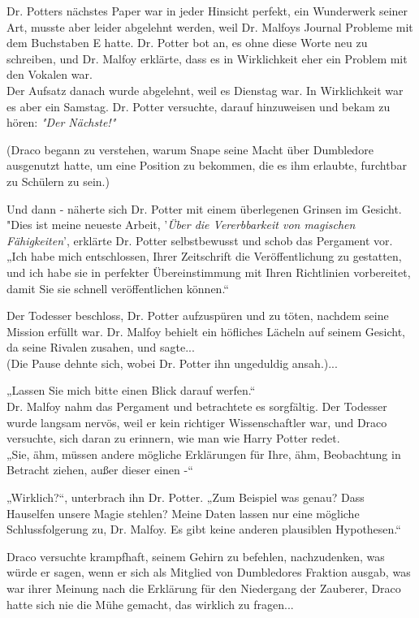 {Dr. Potters nächstes Paper war in jeder Hinsicht perfekt, ein Wunderwerk seiner Art, musste aber leider abgelehnt werden, weil Dr. Malfoys Journal Probleme mit dem Buchstaben E hatte. Dr. Potter bot an, es ohne diese Worte neu zu schreiben, und Dr. Malfoy erklärte, dass es in Wirklichkeit eher ein Problem mit den Vokalen war.\\ Der Aufsatz danach wurde abgelehnt, weil es Dienstag war. In Wirklichkeit war es aber ein Samstag. Dr. Potter versuchte, darauf hinzuweisen und bekam zu hören: \emph{"Der Nächste!"}

(Draco begann zu verstehen, warum Snape seine Macht über Dumbledore ausgenutzt hatte, um eine Position zu bekommen, die es ihm erlaubte, furchtbar zu Schülern zu sein.)

Und dann - näherte sich Dr. Potter mit einem überlegenen Grinsen im Gesicht.\\ "Dies ist meine neueste Arbeit, '\emph{Über die Vererbbarkeit von magischen Fähigkeiten}', erklärte Dr. Potter selbstbewusst und schob das Pergament vor.\\ „Ich habe mich entschlossen, Ihrer Zeitschrift die Veröffentlichung zu gestatten, und ich habe sie in perfekter Übereinstimmung mit Ihren Richtlinien vorbereitet, damit Sie sie schnell veröffentlichen können.“

Der Todesser beschloss, Dr. Potter aufzuspüren und zu töten, nachdem seine Mission erfüllt war. Dr. Malfoy behielt ein höfliches Lächeln auf seinem Gesicht, da seine Rivalen zusahen, und sagte...\\ (Die Pause dehnte sich, wobei Dr. Potter ihn ungeduldig ansah.)...

„Lassen Sie mich bitte einen Blick darauf werfen.“\\ Dr. Malfoy nahm das Pergament und betrachtete es sorgfältig. Der Todesser wurde langsam nervös, weil er kein richtiger Wissenschaftler war, und Draco versuchte, sich daran zu erinnern, wie man wie Harry Potter redet.\\ „Sie, ähm, müssen andere mögliche Erklärungen für Ihre, ähm, Beobachtung in Betracht ziehen, außer dieser einen -“

„Wirklich?“, unterbrach ihn Dr. Potter. „Zum Beispiel was genau? Dass Hauselfen unsere Magie stehlen? Meine Daten lassen nur eine mögliche Schlussfolgerung zu, Dr. Malfoy. Es gibt keine anderen plausiblen Hypothesen.“

Draco versuchte krampfhaft, seinem Gehirn zu befehlen, nachzudenken, was würde er sagen, wenn er sich als Mitglied von Dumbledores Fraktion ausgab, was war ihrer Meinung nach die Erklärung für den Niedergang der Zauberer, Draco hatte sich nie die Mühe gemacht, das wirklich zu fragen...

}
